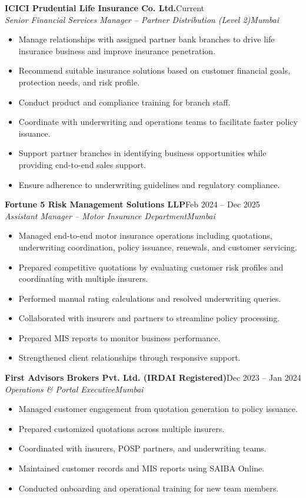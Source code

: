 \documentclass[11pt,a4paper]{article}
\newcommand{\resumeSubheading}[4]{
\textbf{#1}\hfill #2\\[-2pt]
\textit{#3}\hfill \textit{#4}
}
\begin{document}
\resumeSubheading{ICICI Prudential Life Insurance Co. Ltd.}{Current}{Senior Financial Services Manager -- Partner Distribution (Level 2)}{Mumbai}
\begin{itemize}[leftmargin=0.28in]
\item Manage relationships with assigned partner bank branches to drive life insurance business and improve insurance penetration.
\item Recommend suitable insurance solutions based on customer financial goals, protection needs, and risk profile.
\item Conduct product and compliance training for branch staff.
\item Coordinate with underwriting and operations teams to facilitate faster policy issuance.
\item Support partner branches in identifying business opportunities while providing end-to-end sales support.
\item Ensure adherence to underwriting guidelines and regulatory compliance.
\end{itemize}

\resumeSubheading{Fortune 5 Risk Management Solutions LLP}{Feb 2024 -- Dec 2025}{Assistant Manager -- Motor Insurance Department}{Mumbai}
\begin{itemize}[leftmargin=0.28in]
\item Managed end-to-end motor insurance operations including quotations, underwriting coordination, policy issuance, renewals, and customer servicing.
\item Prepared competitive quotations by evaluating customer risk profiles and coordinating with multiple insurers.
\item Performed manual rating calculations and resolved underwriting queries.
\item Collaborated with insurers and partners to streamline policy processing.
\item Prepared MIS reports to monitor business performance.
\item Strengthened client relationships through responsive support.
\end{itemize}

\resumeSubheading{First Advisors Brokers Pvt. Ltd. (IRDAI Registered)}{Dec 2023 -- Jan 2024}{Operations \& Portal Executive}{Mumbai}
\begin{itemize}[leftmargin=0.28in]
\item Managed customer engagement from quotation generation to policy issuance.
\item Prepared customized quotations across multiple insurers.
\item Coordinated with insurers, POSP partners, and underwriting teams.
\item Maintained customer records and MIS reports using SAIBA Online.
\item Conducted onboarding and operational training for new team members.
\end{itemize}
\end{document}
